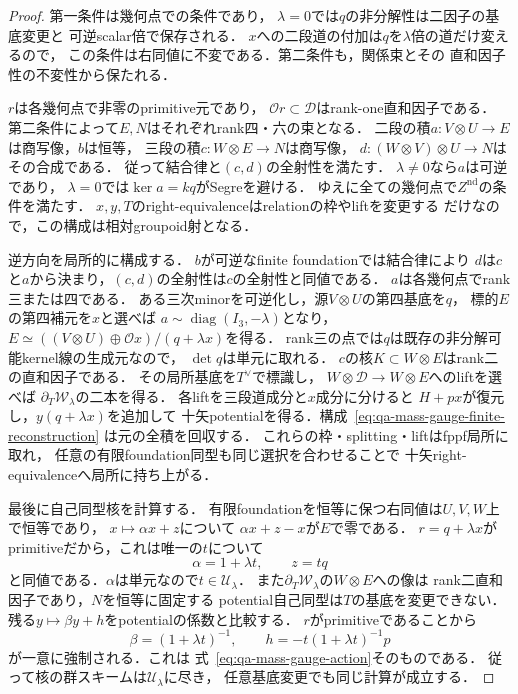 \begin{proof}
第一条件は幾何点での条件であり，
$\lambda=0$では$q$の非分解性は二因子の基底変更と
可逆scalar倍で保存される．
$x$への二段道の付加は$q$を$\lambda$倍の道だけ変えるので，
この条件は右同値に不変である．第二条件も，関係束とその
直和因子性の不変性から保たれる．

$r$は各幾何点で非零のprimitive元であり，
$\mathcal O r\subset\mathcal D$はrank-one直和因子である．
第二条件によって$E,N$はそれぞれrank四・六の束となる．
二段の積$a:V\otimes U\to E$は商写像，$b$は恒等，
三段の積$c:W\otimes E\to N$は商写像，
$d:(W\otimes V)\otimes U\to N$はその合成である．
従って結合律と$(c,d)$の全射性を満たす．
$\lambda\ne0$なら$a$は可逆であり，
$\lambda=0$では$\ker a=kq$がSegreを避ける．
ゆえに全ての幾何点で$Z^{\mathrm{nd}}$の条件を満たす．
$x,y,T$のright-equivalenceはrelationの枠やliftを変更する
だけなので，この構成は相対groupoid射となる．

逆方向を局所的に構成する．
$b$が可逆なfinite foundationでは結合律により
$d$は$c$と$a$から決まり，$(c,d)$の全射性は$c$の全射性と同値である．
$a$は各幾何点でrank三または四である．
ある三次minorを可逆化し，源$V\otimes U$の第四基底を$q$，
標的$E$の第四補元を$x$と選べば
$a\sim\operatorname{diag}(I_3,-\lambda)$となり，
$E\simeq((V\otimes U)\oplus\mathcal O x)/(q+\lambda x)$を得る．
rank三の点では$q$は既存の非分解可能kernel線の生成元なので，
$\det q$は単元に取れる．
$c$の核$K\subset W\otimes E$はrank二の直和因子である．
その局所基底を$T^\vee$で標識し，
$W\otimes\mathcal D\to W\otimes E$へのliftを選べば
$\partial_T\mathcal W_\lambda$の二本を得る．
各liftを三段道成分と$x$成分に分けると
$H+px$が復元し，$y(q+\lambda x)$を追加して
十矢potentialを得る．構成~\eqref{eq:qa-mass-gauge-finite-reconstruction}
は元の全積を回収する．
これらの枠・splitting・liftはfppf局所に取れ，
任意の有限foundation同型も同じ選択を合わせることで
十矢right-equivalenceへ局所に持ち上がる．

最後に自己同型核を計算する．
有限foundationを恒等に保つ右同値は$U,V,W$上で恒等であり，
$x\mapsto\alpha x+z$について
$\alpha x+z-x$が$E$で零である．
$r=q+\lambda x$がprimitiveだから，これは唯一の$t$について
\[
 \alpha=1+\lambda t,\qquad z=tq
\]
と同値である．$\alpha$は単元なので$t\in\mathcal U_\lambda$．
また$\partial_T\mathcal W_\lambda$の$W\otimes E$への像は
rank二直和因子であり，$N$を恒等に固定する
potential自己同型は$T$の基底を変更できない．
残る$y\mapsto\beta y+h$をpotentialの係数と比較する．
$r$がprimitiveであることから
\[
 \beta=(1+\lambda t)^{-1},
 \qquad h=-t(1+\lambda t)^{-1}p
\]
が一意に強制される．これは
式~\eqref{eq:qa-mass-gauge-action}そのものである．
従って核の群スキームは$\mathcal U_\lambda$に尽き，
任意基底変更でも同じ計算が成立する．
\end{proof}

